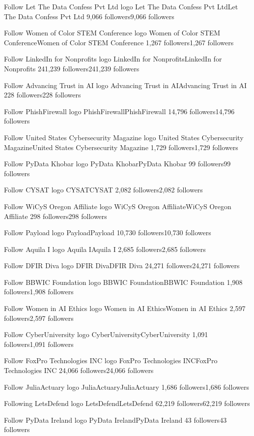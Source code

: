 Follow
Let The Data Confess Pvt Ltd logo
Let The Data Confess Pvt LtdLet The Data Confess Pvt Ltd
9,066 followers9,066 followers

Follow
Women of Color STEM Conference logo
Women of Color STEM ConferenceWomen of Color STEM Conference
1,267 followers1,267 followers

Follow
LinkedIn for Nonprofits logo
LinkedIn for NonprofitsLinkedIn for Nonprofits
241,239 followers241,239 followers

Follow
Advancing Trust in AI logo
Advancing Trust in AIAdvancing Trust in AI
228 followers228 followers

Follow
PhishFirewall logo
PhishFirewallPhishFirewall
14,796 followers14,796 followers

Follow
United States Cybersecurity Magazine logo
United States Cybersecurity MagazineUnited States Cybersecurity Magazine
1,729 followers1,729 followers

Follow
PyData Khobar logo
PyData KhobarPyData Khobar
99 followers99 followers

Follow
CYSAT logo
CYSATCYSAT
2,082 followers2,082 followers

Follow
WiCyS Oregon Affiliate logo
WiCyS Oregon AffiliateWiCyS Oregon Affiliate
298 followers298 followers

Follow
Payload logo
PayloadPayload
10,730 followers10,730 followers

Follow
Aquila I logo
Aquila IAquila I
2,685 followers2,685 followers

Follow
DFIR Diva logo
DFIR DivaDFIR Diva
24,271 followers24,271 followers

Follow
BBWIC Foundation logo
BBWIC FoundationBBWIC Foundation
1,908 followers1,908 followers

Follow
Women in AI Ethics logo
Women in AI EthicsWomen in AI Ethics
2,597 followers2,597 followers

Follow
CyberUniversity logo
CyberUniversityCyberUniversity
1,091 followers1,091 followers

Follow
FoxPro Technologies INC logo
FoxPro Technologies INCFoxPro Technologies INC
24,066 followers24,066 followers

Follow
JuliaActuary logo
JuliaActuaryJuliaActuary
1,686 followers1,686 followers

Following
LetsDefend logo
LetsDefendLetsDefend
62,219 followers62,219 followers

Follow
PyData Ireland logo
PyData IrelandPyData Ireland
43 followers43 followers

